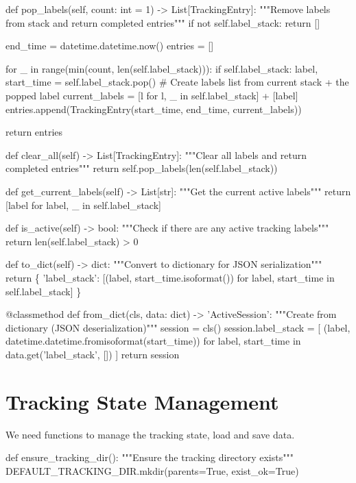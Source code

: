     def pop_labels(self, count: int = 1) -> List[TrackingEntry]:
        """Remove labels from stack and return completed entries"""
        if not self.label_stack:
            return []
            
        end_time = datetime.datetime.now()
        entries = []
        
        for _ in range(min(count, len(self.label_stack))):
            if self.label_stack:
                label, start_time = self.label_stack.pop()
                # Create labels list from current stack + the popped label
                current_labels = [l for l, _ in self.label_stack] + [label]
                entries.append(TrackingEntry(start_time, end_time, current_labels))
                
        return entries
    
    def clear_all(self) -> List[TrackingEntry]:
        """Clear all labels and return completed entries"""
        return self.pop_labels(len(self.label_stack))
    
    def get_current_labels(self) -> List[str]:
        """Get the current active labels"""
        return [label for label, _ in self.label_stack]
    
    def is_active(self) -> bool:
        """Check if there are any active tracking labels"""
        return len(self.label_stack) > 0
    
    def to_dict(self) -> dict:
        """Convert to dictionary for JSON serialization"""
        return \{
            'label_stack': [(label, start_time.isoformat()) 
                          for label, start_time in self.label_stack]
        \}
    
    @classmethod
    def from_dict(cls, data: dict) -> 'ActiveSession':
        """Create from dictionary (JSON deserialization)"""
        session = cls()
        session.label_stack = [
            (label, datetime.datetime.fromisoformat(start_time))
            for label, start_time in data.get('label_stack', [])
        ]
        return session
\nwendcode{}\nwdocspar

\section{Tracking State Management}

We need functions to manage the tracking state, load and save data.

\nwenddocs{}\endmoddef\nwstartdeflinemarkup{}\nwenddeflinemarkup
def ensure_tracking_dir():
    """Ensure the tracking directory exists"""
    DEFAULT_TRACKING_DIR.mkdir(parents=True, exist_ok=True)

